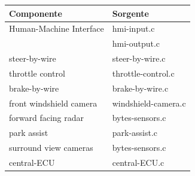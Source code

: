 \documentclass[11pt, openany]{article}
\theoremstyle{definition}
\theoremstyle{plain}
\theoremstyle{remark}
\begin{document}
			\begin{tcolorbox}[width=\textwidth,colback={Cornsilk2}]\label{tab:sorgenti}
				\begin{tabularx}{\textwidth}{p{8cm}  l}
					\textbf{Componente}			&	\textbf{Sorgente}	\\\toprule
					Human-Machine Interface 	& 	hmi-input.c			\\
												&	hmi-output.c		\\\midrule
					steer-by-wire				&	steer-by-wire.c		\\\midrule
					throttle control			&	throttle-control.c	\\\midrule
					brake-by-wire				&	brake-by-wire.c		\\\midrule
					front windshield camera		&	windshield-camera.c	\\\midrule
					forward facing radar		&	bytes-sensors.c		\\\midrule
					park assist					&	park-assist.c		\\\midrule
					surround view cameras		&	bytes-sensors.c		\\\midrule
					central-ECU					&	central-ECU.c
				\end{tabularx}
			\end{tcolorbox}
\end{document}
